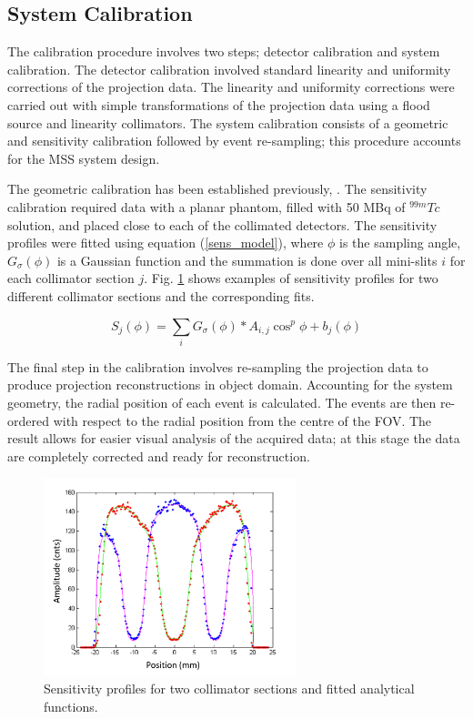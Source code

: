 \subsection{System Calibration}
 The calibration procedure involves two steps; detector calibration and system calibration. The detector calibration involved standard linearity and uniformity corrections of the projection data. The linearity and uniformity corrections were carried out with simple transformations of the projection data using a flood source and linearity collimators. The system calibration consists of a geometric and sensitivity calibration followed by event re-sampling; this procedure accounts for the MSS system design. 
 
The geometric calibration has been established previously, \cite{8340862}. The sensitivity calibration required data with a planar phantom, filled with 50 MBq of $^{99m}Tc$ solution, and placed close to each of the collimated detectors. The sensitivity profiles were fitted using equation (\ref{sens_model}), where $\phi$ is the sampling angle, $G_{\sigma}(\phi)$ is a Gaussian function and the summation is done over all mini-slits $i$ for each collimator section $j$. Fig. \ref{fig_sensprof} shows examples of sensitivity profiles for two different collimator sections and the corresponding fits.

\begin{equation}
\label{sens_model}
S_{j}(\phi) = \sum_{i} G_{\sigma}(\phi) \ast A_{i,j} \cos^{p}{\phi} + b_{j}(\phi)
\end{equation}

The final step in the calibration involves re-sampling the projection data to produce projection reconstructions in object domain. Accounting for the system geometry, the radial position of each event is calculated. The events are then re-ordered with respect to the radial position from the centre of the FOV. The result allows for easier visual analysis of the acquired data; at this stage the data are completely corrected and ready for reconstruction. 

\begin{figure}[!t]
\centering
\includegraphics[width=2.9in]{figures/sns_prof.png}

\caption{Sensitivity profiles for two collimator sections and fitted analytical functions.}
\label{fig_sensprof}
\end{figure}
 
